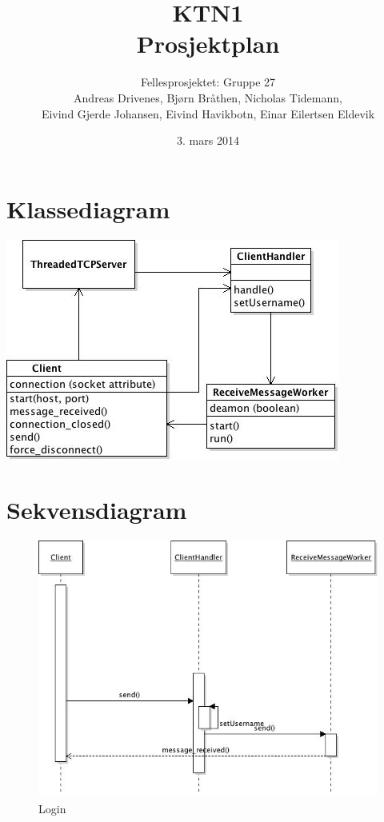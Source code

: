 \documentclass[a4paper,12pt, norsk]{article}
\title{KTN1 \\ Prosjektplan}
\author{Fellesprosjektet: Gruppe 27 \\ Andreas Drivenes, Bjørn Bråthen, Nicholas Tidemann, \\ Eivind Gjerde Johansen, Eivind Havikbotn, Einar Eilertsen Eldevik}
\date{3. mars 2014}
\begin{document}
\maketitle

\section*{Klassediagram}
\includegraphics{klassediagram.jpg}

\clearpage


\section*{Sekvensdiagram}

\begin{figure}[!htb]
\centerline{\includegraphics[scale=0.75]{login}}
\caption{Login}
\label{fig:lgoin}
\end{figure}
\end{document}
